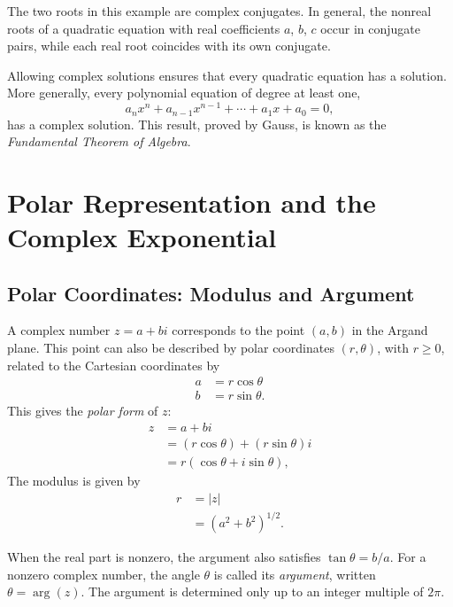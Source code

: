 The two roots in this example are complex conjugates. In general, the nonreal roots of a quadratic equation with real coefficients $a$, $b$, $c$
occur in conjugate pairs, while each real root coincides with its own conjugate.

Allowing complex solutions ensures that every quadratic equation has a solution. More generally, every polynomial equation of degree at least one,
\[
a_n x^n + a_{n-1} x^{n-1} + \cdots + a_1 x + a_0 = 0,
\]
has a complex solution. This result, proved by Gauss, is known as the \textit{Fundamental Theorem of Algebra}.

\section{Polar Representation and the Complex Exponential}

\subsection{Polar Coordinates: Modulus and Argument}

A complex number $z = a+bi$ corresponds to the point $(a,b)$ in the Argand plane. This point can also be described by polar coordinates
$(r,\theta)$, with $r \geq 0$, related to the Cartesian coordinates by
\[
\begin{aligned}
a &= r \cos \theta \\
b &= r \sin \theta.
\end{aligned}
\]
This gives the \emph{polar form} of $z$:
\[
\begin{aligned}
z &= a+bi \\
&= (r\cos\theta) + (r\sin\theta) i \\
&= r(\cos\theta + i \sin\theta),
\end{aligned}
\]
The modulus is given by
\[
\begin{aligned}
r &= |z| \\
&= (a^2+b^2)^{1/2}.
\end{aligned}
\]

When the real part is nonzero, the argument also satisfies $\tan \theta = b/a$.
For a nonzero complex number, the angle $\theta$ is called its \emph{argument}, written $\theta = \arg(z)$.
The argument is determined only up to an integer multiple of $2\pi$.


